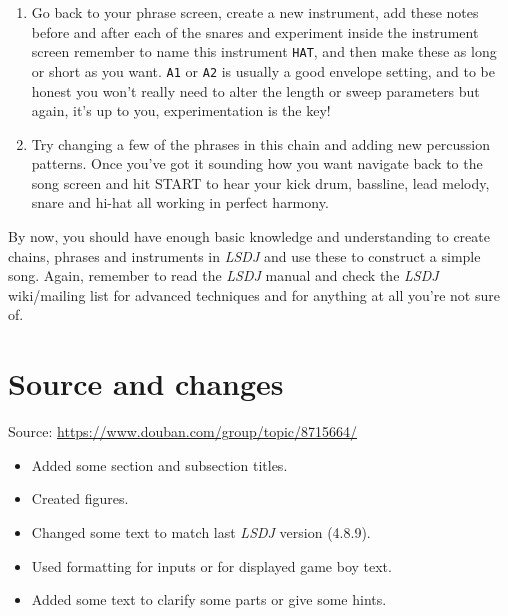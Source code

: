 \documentclass[]{article}
\newcommand{\buttonStyle}[1]{\textsf{#1}\xspace}
\newcommand{\bStart}{\buttonStyle{{START}}}
\newcommand{\gbtxt}[1]{\texttt{#1}\xspace}
\newcommand{\lsdj}{\textit{LSDJ}\xspace}
\begin{document}
\begin{enumerate}

\item Go back to your phrase screen, create a new instrument, add these notes before and after each of the snares and experiment inside the instrument screen remember to name this instrument \gbtxt{HAT}, and then make these as long or short as you want. \gbtxt{A1} or \gbtxt{A2} is usually a good envelope setting, and to be honest you won't really need to alter the length or sweep parameters but again, it's up to you, experimentation is the key!

\item Try changing a few of the phrases in this chain and adding new percussion patterns. Once you've got it sounding how you want navigate back to the song screen and hit \bStart to hear your kick drum, bassline, lead melody, snare and hi-hat all working in perfect harmony.

\end{enumerate}

By now, you should have enough basic knowledge and understanding to create chains, phrases and instruments in \lsdj and use these to construct a simple song. Again, remember to read the \lsdj manual and check the \lsdj wiki/mailing list for advanced techniques and for anything at all you're not sure of.


\section*{Source and changes}

Source: \url{https://www.douban.com/group/topic/8715664/}

\begin{itemize}
	\item Added some section and subsection titles.
	\item Created figures.
	\item Changed some text to match last \lsdj version (4.8.9).
	\item Used formatting for inputs or for displayed game boy text.
	\item Added some text to clarify some parts or give some hints.
\end{itemize}
\end{document}
